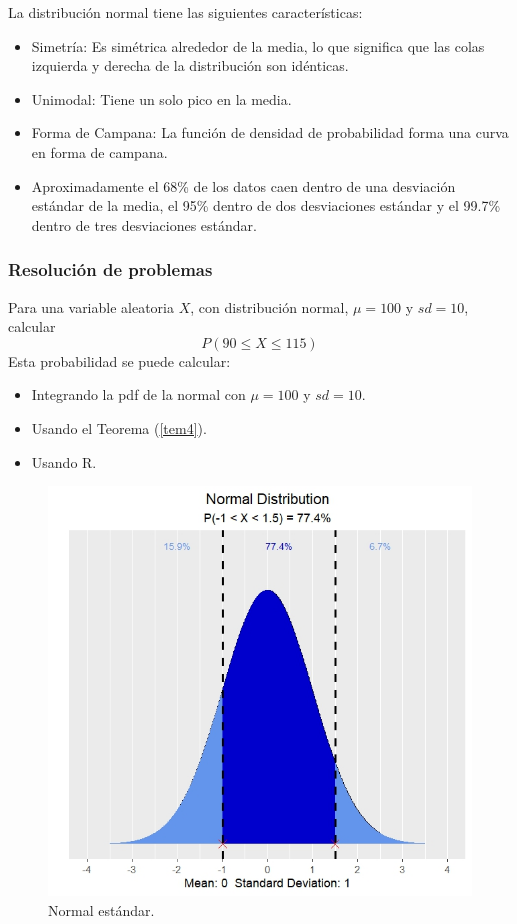 \begin{i}
La distribución normal tiene las siguientes características:

\begin{itemize}
    \item Simetría: Es simétrica alrededor de la media, lo que significa que las colas izquierda y derecha de la distribución son idénticas.
    \item Unimodal: Tiene un solo pico en la media.
    \item Forma de Campana: La función de densidad de probabilidad forma una curva en forma de campana.
    \item  Aproximadamente el 68\% de los datos caen dentro de una desviación estándar de la media, el 95\% dentro de dos desviaciones estándar y el 99.7\% dentro de tres desviaciones estándar.

\end{itemize}



\subsubsection{Resolución de problemas}

Para una variable aleatoria $X$, con distribución normal, $\mu=100$ y $sd=10$, calcular
$$
P(90 \leq X \leq 115)
$$
Esta probabilidad se puede calcular:
\begin{itemize}
    \item Integrando la pdf de la normal con $\mu=100$ y $sd=10$.
    \item Usando el Teorema (\ref{tem4}).
    \item Usando R.
\end{itemize}

\begin{figure}[h!]
\centering
\includegraphics[scale=0.8]{Figuras/Normal_prob.jpeg}
\caption{Normal estándar.}
\end{figure}


\end{i}

